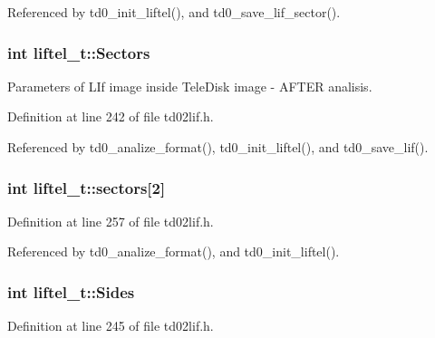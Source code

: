 Referenced by td0\+\_\+init\+\_\+liftel(), and td0\+\_\+save\+\_\+lif\+\_\+sector().

\subsubsection[{\texorpdfstring{Sectors}{Sectors}}]{\setlength{\rightskip}{0pt plus 5cm}int liftel\+\_\+t\+::\+Sectors}\hypertarget{structliftel__t_aa20cc45cd196c86b7d6176914226eacf}{}\label{structliftel__t_aa20cc45cd196c86b7d6176914226eacf}


Parameters of L\+If image inside Tele\+Disk image -\/ A\+F\+T\+ER analisis. 



Definition at line 242 of file td02lif.\+h.



Referenced by td0\+\_\+analize\+\_\+format(), td0\+\_\+init\+\_\+liftel(), and td0\+\_\+save\+\_\+lif().

\subsubsection[{\texorpdfstring{sectors}{sectors}}]{\setlength{\rightskip}{0pt plus 5cm}int liftel\+\_\+t\+::sectors\mbox{[}2\mbox{]}}\hypertarget{structliftel__t_a04c852b0fdc7a7c04d558d9a201f3f0d}{}\label{structliftel__t_a04c852b0fdc7a7c04d558d9a201f3f0d}


Definition at line 257 of file td02lif.\+h.



Referenced by td0\+\_\+analize\+\_\+format(), and td0\+\_\+init\+\_\+liftel().

\subsubsection[{\texorpdfstring{Sides}{Sides}}]{\setlength{\rightskip}{0pt plus 5cm}int liftel\+\_\+t\+::\+Sides}\hypertarget{structliftel__t_a1fafd0f113738152a2ae6251c2f528f7}{}\label{structliftel__t_a1fafd0f113738152a2ae6251c2f528f7}


Definition at line 245 of file td02lif.\+h.



